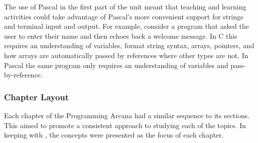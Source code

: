The use of Pascal in the first part of the unit meant that teaching and learning activities could take advantage of Pascal's more convenient support for strings and terminal input and output. For example, consider a program that asked the user to enter their name and then echoes back a welcome message. In C this requires an understanding of variables, format string syntax, arrays, pointers, and how arrays are automatically passed by references where other types are not. In Pascal the same program only requires an understanding of variables and pass-by-reference.




\clearpage
\subsubsection{Chapter Layout} %
\label{ssub:chapter_layout}

Each chapter of the Programming Arcana had a similar sequence to its sections. This aimed to promote a consistent approach to studying each of the topics. In keeping with , the concepts were presented as the focus of each chapter. %


